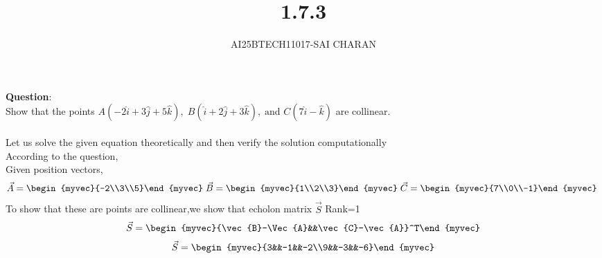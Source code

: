 \documentclass[journal]{IEEEtran}
\begin{document}

\vspace{3cm}

\title{1.7.3}
\author{AI25BTECH11017-SAI CHARAN}
 \maketitle
{\let\newpage\relax\maketitle}
\renewcommand{\thefigure}{\theenumi}
\renewcommand{\thetable}{\theenumi}
\setlength{\intextsep}{10pt} %
\renewcommand{\thetable}{\theenumi}
\textbf{Question}:\\
Show that the points $A(-2\hat{i} + 3\hat{j} + 5\hat{k}), \; 
B(\hat{i} + 2\hat{j} + 3\hat{k}), \; 
\text{and } C(7\hat{i} - \hat{k})$ are collinear.
\\ 
\solution \\
Let us solve the given equation theoretically and then verify the solution computationally \\
According to the question, \\
Given position vectors,
\begin{align}
    \vec{A}=\begin{myvec}{-2\\3\\5}\end{myvec}\;
    \vec{B}=\begin{myvec}{1\\2\\3}\end{myvec}\;
    \vec{C}=\begin{myvec}{7\\0\\-1}\end{myvec}\;
\end{align}
To show that these are points are collinear,we show that echolon matrix $\vec{S}$ Rank=1\\

\begin{align}
    \vec{S}=\begin{myvec}{\vec{B}-\Vec{A}&&\vec{C}-\vec{A}}^T\end{myvec}
\end{align}
\begin{align}
    \vec{S}=\begin{myvec}{3&&-1&&-2\\9&&-3&&-6}\end{myvec}
\end{align}
\end{document}
